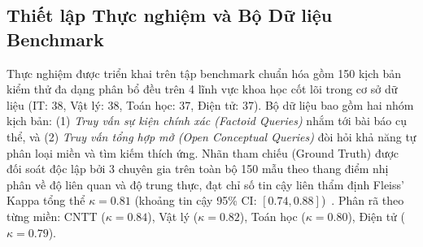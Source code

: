 \documentclass[conference]{IEEEtran}
\begin{document}
\begin{table}[!t]
\caption{SO SÁNH ĐỊNH LƯỢNG VỚI CÁC MÔ HÌNH CƠ SỞ VÀ SOTA BASELINES (GIÁ TRỊ TRUNG BÌNH $\pm$ ĐỘ LỆCH CHUẨN QUA 5 LẦN CHẠY, $N = 150$)}
\label{tab1}
\begin{center}
\end{center}
\end{table}

\subsection{Thiết lập Thực nghiệm và Bộ Dữ liệu Benchmark}
Thực nghiệm được triển khai trên tập benchmark chuẩn hóa gồm 150 kịch bản kiểm thử đa dạng phân bổ đều trên 4 lĩnh vực khoa học cốt lõi trong cơ sở dữ liệu (IT: 38, Vật lý: 38, Toán học: 37, Điện tử: 37). Bộ dữ liệu bao gồm hai nhóm kịch bản: (1) \textit{Truy vấn sự kiện chính xác (Factoid Queries)} nhắm tới bài báo cụ thể, và (2) \textit{Truy vấn tổng hợp mở (Open Conceptual Queries)} đòi hỏi khả năng tự phân loại miền và tìm kiếm thích ứng. Nhãn tham chiếu (Ground Truth) được đối soát độc lập bởi 3 chuyên gia trên toàn bộ 150 mẫu theo thang điểm nhị phân về độ liên quan và độ trung thực, đạt chỉ số tin cậy liên thẩm định Fleiss' Kappa tổng thể $\kappa = 0.81$ (khoảng tin cậy 95\% CI: $[0.74, 0.88]$)~\cite{fleiss1971measuring}. Phân rã theo từng miền: CNTT ($\kappa = 0.84$), Vật lý ($\kappa = 0.82$), Toán học ($\kappa = 0.80$), Điện tử ($\kappa = 0.79$).
\end{document}
